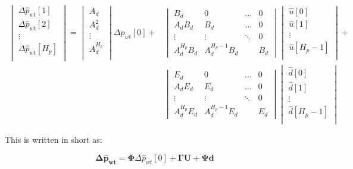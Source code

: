 \begin{align}
	\begin{vmatrix}
\Delta \hat p_{wt}[1] \\ 
\Delta \hat p_{wt}[2]\\ 
\vdots \\ 
\Delta \hat p_{wt}[H_p]\\ 
\end{vmatrix}
=
\begin{vmatrix}
A_d \\ 
A_d^2\\ 
\vdots \\ 
A_d^{H_p}\\ 
\end{vmatrix}
\Delta p_{wt}[0]+\nonumber
&\begin{vmatrix}
 B_d& 0 & \hdots  & 0\\ 
 A_dB_d&  B_d& \hdots & 0\\ 
\vdots &\vdots  & \ddots  & 0\\ 
 A_d^{H_p}B_d& A_d^{H_p-1}B_d  &  & B_d
\end{vmatrix}
\begin{vmatrix}
\hat u[0] \\ 
\hat u[1]\\ 
\vdots \\ 
\hat u[H_p-1]\\ 
\end{vmatrix}
+ \\
&\begin{vmatrix}
 E_d& 0 & \hdots  & 0\\ 
 A_dE_d&  E_d& \hdots & 0\\ 
\vdots &\vdots  & \ddots  & 0\\ 
 A_d^{H_p}E_d& A_d^{H_p-1}E_d  &  & E_d
\end{vmatrix}
\begin{vmatrix}
\hat d[0] \\ 
\hat d[1]\\ 
\vdots \\ 
\hat d[H_p-1]\\ 
\end{vmatrix} 
\end{align}

This is written in short as: 

\begin{equation}
	\bm{\Delta \hat p_{wt}} = \bm{\Phi} \Delta \hat p_{wt}[0] + \bm{\Gamma U} + \bm{\Psi d}
\end{equation}